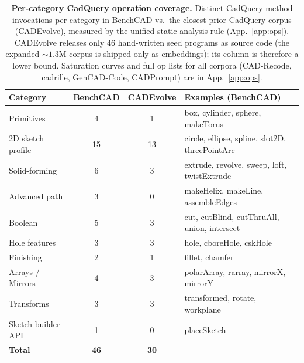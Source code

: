\begin{table}[t]
\centering
\small
\setlength{\tabcolsep}{5pt}
\renewcommand{\arraystretch}{1.05}
\caption{\textbf{Per-category CadQuery operation coverage.} Distinct CadQuery method invocations per category in BenchCAD vs.\ the closest prior CadQuery corpus (CADEvolve), measured by the unified static-analysis rule (App.~\ref{app:ops}). CADEvolve releases only $46$ hand-written seed programs as source code (the expanded $\sim$$1.3$M corpus is shipped only as embeddings); its column is therefore a lower bound. Saturation curves and full op lists for all corpora (CAD-Recode, cadrille, GenCAD-Code, CADPrompt) are in App.~\ref{app:ops}.}
\label{tab:op_coverage}
\begin{tabular}{@{}lcc@{\hskip 1.4em}l@{}}
\toprule
Category & BenchCAD & CADEvolve & Examples (BenchCAD) \\
\midrule
Primitives           & 4   & 1   & box, cylinder, sphere, makeTorus \\
2D sketch profile    & 15  & 13  & circle, ellipse, spline, slot2D, threePointArc \\
Solid-forming        & 6   & 3   & extrude, revolve, sweep, loft, twistExtrude \\
Advanced path        & 3   & 0   & makeHelix, makeLine, assembleEdges \\
Boolean              & 5   & 3   & cut, cutBlind, cutThruAll, union, intersect \\
Hole features        & 3   & 3   & hole, cboreHole, cskHole \\
Finishing            & 2   & 1   & fillet, chamfer \\
Arrays / Mirrors     & 4   & 3   & polarArray, rarray, mirrorX, mirrorY \\
Transforms           & 3   & 3   & transformed, rotate, workplane \\
Sketch builder API   & 1   & 0   & placeSketch \\
\midrule
\textbf{Total}       & \textbf{46} & \textbf{30} & \\
\bottomrule
\end{tabular}
\end{table}
